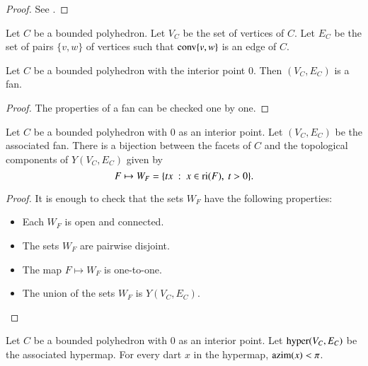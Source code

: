 \begin{proof} See \cite{webster:1994}.
\end{proof}

\begin{definition} Let $C$ be a bounded polyhedron.
Let $V_C$ be the set of vertices of $C$.  Let $E_C$ be the set of pairs $\{v,w\}$ of vertices such that ${\operatorname{conv}}\{v,w\}$ is an edge of $C$.
\end{definition}

\begin{lemma}\label{lemma:polyhedron}%
Let $C$ be a bounded polyhedron with the interior point $0$.
Then $(V_C,E_C)$ is a fan.
\end{lemma}

\begin{proof} The properties of a fan can be checked one by one.
\end{proof}

\begin{lemma} Let $C$ be a bounded polyhedron with $0$ as an interior point.  Let $(V_C,E_C)$ be the associated fan.  There is a bijection between the facets of $C$ and the topological components of $Y(V_C,E_C)$ given by 
$$
F \mapsto W_F = \{t x \ :\  x\in {\operatorname{ri}}(F),~t >0\}.
$$
\end{lemma}

\begin{proof} It is enough to check that the sets $W_F$ have the following properties:
\begin{itemize}
\item Each $W_F$ is open and connected.
\item The sets $W_F$ are pairwise disjoint.
\item The map $F\mapsto W_F$ is one-to-one.
\item The union of the sets $W_F$ is $Y(V_C,E_C)$.
\end{itemize}
\end{proof}


\begin{lemma} Let $C$ be a bounded polyhedron with $0$ as an interior point.  Let ${\operatorname{hyper}}(V_C,E_C)$ be the associated hypermap.  For every dart $x$ in the hypermap, ${\operatorname{azim}}(x) < \pi$.
\end{lemma}

